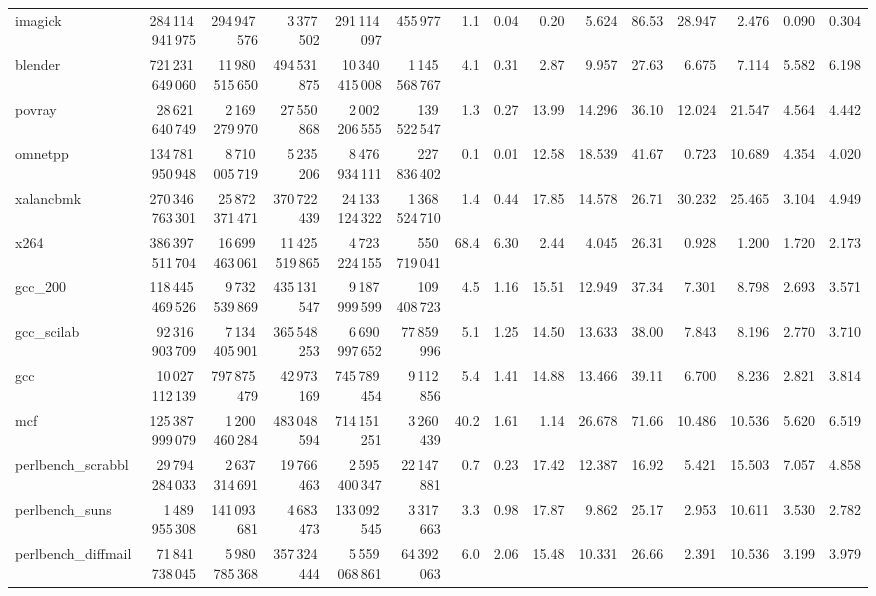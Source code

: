 \documentclass[9pt,landscape,a4paper]{article}
\begin{document}
\begin{adjustbox}{max width=\textwidth, max totalheight=0.50\textheight}
\begin{tabular}{lrrrrrrrrrrrrrr}
imagick & 284\,114\,941\,975 & 294\,947\,576 & 3\,377\,502 & 291\,114\,097 & 455\,977 & 1.1 & 0.04 & 0.20 & 5.624 & 86.53 & 28.947 & 2.476 & 0.090 & 0.304 \\
blender & 721\,231\,649\,060 & 11\,980\,515\,650 & 494\,531\,875 & 10\,340\,415\,008 & 1\,145\,568\,767 & 4.1 & 0.31 & 2.87 & 9.957 & 27.63 & 6.675 & 7.114 & 5.582 & 6.198 \\
povray & 28\,621\,640\,749 & 2\,169\,279\,970 & 27\,550\,868 & 2\,002\,206\,555 & 139\,522\,547 & 1.3 & 0.27 & 13.99 & 14.296 & 36.10 & 12.024 & 21.547 & 4.564 & 4.442 \\
omnetpp & 134\,781\,950\,948 & 8\,710\,005\,719 & 5\,235\,206 & 8\,476\,934\,111 & 227\,836\,402 & 0.1 & 0.01 & 12.58 & 18.539 & 41.67 & 0.723 & 10.689 & 4.354 & 4.020 \\
xalancbmk & 270\,346\,763\,301 & 25\,872\,371\,471 & 370\,722\,439 & 24\,133\,124\,322 & 1\,368\,524\,710 & 1.4 & 0.44 & 17.85 & 14.578 & 26.71 & 30.232 & 25.465 & 3.104 & 4.949 \\
x264 & 386\,397\,511\,704 & 16\,699\,463\,061 & 11\,425\,519\,865 & 4\,723\,224\,155 & 550\,719\,041 & 68.4 & 6.30 & 2.44 & 4.045 & 26.31 & 0.928 & 1.200 & 1.720 & 2.173 \\
gcc\_200 & 118\,445\,469\,526 & 9\,732\,539\,869 & 435\,131\,547 & 9\,187\,999\,599 & 109\,408\,723 & 4.5 & 1.16 & 15.51 & 12.949 & 37.34 & 7.301 & 8.798 & 2.693 & 3.571 \\
gcc\_scilab & 92\,316\,903\,709 & 7\,134\,405\,901 & 365\,548\,253 & 6\,690\,997\,652 & 77\,859\,996 & 5.1 & 1.25 & 14.50 & 13.633 & 38.00 & 7.843 & 8.196 & 2.770 & 3.710 \\
gcc & 10\,027\,112\,139 & 797\,875\,479 & 42\,973\,169 & 745\,789\,454 & 9\,112\,856 & 5.4 & 1.41 & 14.88 & 13.466 & 39.11 & 6.700 & 8.236 & 2.821 & 3.814 \\
mcf & 125\,387\,999\,079 & 1\,200\,460\,284 & 483\,048\,594 & 714\,151\,251 & 3\,260\,439 & 40.2 & 1.61 & 1.14 & 26.678 & 71.66 & 10.486 & 10.536 & 5.620 & 6.519 \\
perlbench\_scrabbl & 29\,794\,284\,033 & 2\,637\,314\,691 & 19\,766\,463 & 2\,595\,400\,347 & 22\,147\,881 & 0.7 & 0.23 & 17.42 & 12.387 & 16.92 & 5.421 & 15.503 & 7.057 & 4.858 \\
perlbench\_suns & 1\,489\,955\,308 & 141\,093\,681 & 4\,683\,473 & 133\,092\,545 & 3\,317\,663 & 3.3 & 0.98 & 17.87 & 9.862 & 25.17 & 2.953 & 10.611 & 3.530 & 2.782 \\
perlbench\_diffmail & 71\,841\,738\,045 & 5\,980\,785\,368 & 357\,324\,444 & 5\,559\,068\,861 & 64\,392\,063 & 6.0 & 2.06 & 15.48 & 10.331 & 26.66 & 2.391 & 10.536 & 3.199 & 3.979 \\

\end{tabular}
\end{adjustbox}
\end{document}
